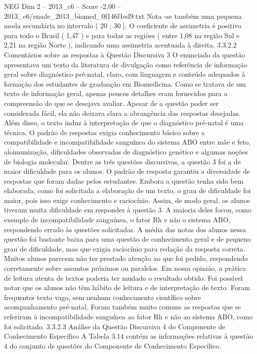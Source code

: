 \begin{textsample}{NEG Dim 2 – 2013\_c6 – Score -2.00 – 2013\_c6/enade\_2013\_biomed\_0f146f1ed9.txt}
Nota -se também uma pequena moda secundária no intervalo ( 20 ; 30 ].
O coeficiente de assimetria é positivo para todo o Brasil ( 1,47 ) e para todas as regiões ( entre 1,08 na região Sul e 2,21 na região Norte ), indicando uma assimetria acentuada à direita. 3.3.2.2 Comentários sobre as respostas à Questão Discursiva 3 O enunciado da questão apresentava um texto da literatura de divulgação como referência de informação geral sobre diagnóstico pré-natal, claro, com linguagem e conteúdo adequados à formação dos estudantes de graduação em Biomedicina.
Como se tratava de um texto de informação geral, apenas poucos detalhes eram fornecidos para a compreensão do que se desejava avaliar.
Apesar de a questão poder ser considerada fácil, ela não deixava clara a abrangência das respostas desejadas.
Além disso, o texto induz à interpretação de que o diagnóstico pré-natal é uma técnica.
O padrão de respostas exigia conhecimento básico sobre a compatibilidade e incompatibilidade sanguínea do sistema ABO entre mãe e feto, aloimunização, dificuldades observadas de diagnóstico genético e algumas noções de biologia molecular.
Dentre as três questões discursivas, a questão 3 foi a de maior dificuldade para os alunos.
O padrão de resposta garantiu a diversidade de respostas que foram dadas pelos estudantes.
Embora a questão tenha sido bem elaborada, como foi solicitada a elaboração de um texto, o grau de dificuldade foi maior, pois isso exige conhecimento e raciocínio.
Assim, de modo geral, os alunos tiveram muita dificuldade em responder à questão 3.
A maioria deles focou, como exemplo de incompatibilidade sanguínea, o fator Rh e não o sistema ABO, respondendo errado às questões solicitadas.
A média das notas dos alunos nessa questão foi bastante baixa para uma questão de conhecimento geral e de pequeno grau de dificuldade, mas que exigia raciocínio para redação da resposta correta.
Muitos alunos parecem não ter prestado atenção ao que foi pedido, respondendo corretamente sobre assuntos próximos ou paralelos.
Em nossa opinião, a prática de leitura atenta de textos poderia ter mudado o resultado obtido.
Foi possível notar que os alunos não têm hábito de leitura e de interpretação de texto.
Foram frequentes texto vago, sem nenhum conhecimento científico sobre acompanhamento pré-natal.
Foram também muito comuns as respostas que se referiram à incompatibilidade sanguínea ao fator Rh e não ao sistema ABO, como foi solicitado. 3.3.2.3 Análise da Questão Discursiva 4 do Componente de Conhecimento Específico A Tabela 3.14 contém as informações relativas à questão 4 do conjunto de questões do Componente de Conhecimento Específico.

\end{textsample}
